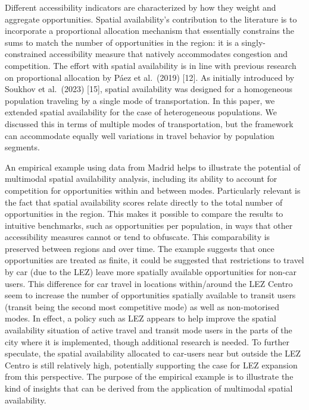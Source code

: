 \documentclass[10pt,letterpaper]{article}
\begin{document}
Different accessibility indicators are characterized by how they weight
and aggregate opportunities. Spatial availability's contribution to the
literature is to incorporate a proportional allocation mechanism that
essentially constrains the sums to match the number of opportunities in
the region: it is a singly-constrained accessibility measure that
natively accommodates congestion and competition. The effort with
spatial availability is in line with previous research on proportional
allocation by Páez et al.~(2019) {[}12{]}. As initially introduced by
Soukhov et al.~(2023) {[}15{]}, spatial availability was designed for a
homogeneous population traveling by a single mode of transportation. In
this paper, we extended spatial availability for the case of
heterogeneous populations. We discussed this in terms of multiple modes
of transportation, but the framework can accommodate equally well
variations in travel behavior by population segments.

An empirical example using data from Madrid helps to illustrate the
potential of multimodal spatial availability analysis, including its
ability to account for competition for opportunities within and between
modes. Particularly relevant is the fact that spatial availability
scores relate directly to the total number of opportunities in the
region. This makes it possible to compare the results to intuitive
benchmarks, such as opportunities per population, in ways that other
accessibility measures cannot or tend to obfuscate. This comparability
is preserved between regions and over time. The example suggests that
once opportunities are treated as finite, it could be suggested that
restrictions to travel by car (due to the LEZ) leave more spatially
available opportunities for non-car users. This difference for car
travel in locations within/around the LEZ Centro seem to increase the
number of opportunities spatially available to transit users (transit
being the second most competitive mode) as well as non-motorised modes.
In effect, a policy such as LEZ appears to help improve the spatial
availability situation of active travel and transit mode users in the
parts of the city where it is implemented, though additional research is
needed. To further speculate, the spatial availability allocated to
car-users near but outside the LEZ Centro is still relatively high,
potentially supporting the case for LEZ expansion from this perspective.
The purpose of the empirical example is to illustrate the kind of
insights that can be derived from the application of multimodal spatial
availability.
\end{document}
